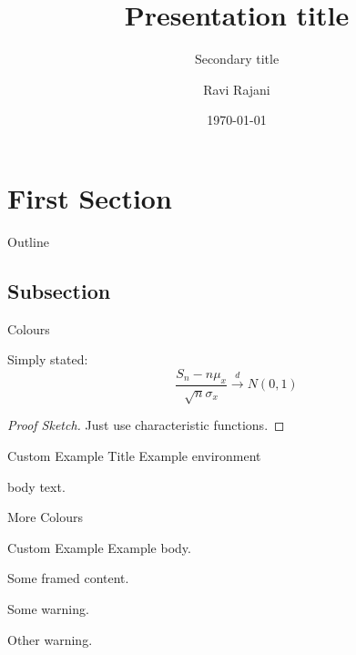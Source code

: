 \documentclass{slides} %
\title{Presentation title}
\subtitle{Secondary title}
\author{Ravi Rajani}
\institute{Department of Mathematics}
\date{\today}
\begin{document}
\begin{frame}
  \titlepage
\end{frame}

\section{First Section}

\begin{frame}{Outline}
  \tableofcontents[currentsection]
\end{frame}

\subsection{Subsection}

\begin{frame}{Colours}
  \begin{theorem}
    Simply stated:
    \[
      \frac{S_n - n\mu_x}{\sqrt{n}\sigma_x}\stackrel{d}{\to} N(0,1)
    \]
  \end{theorem}
  \begin{proof}[Proof Sketch]
    Just use characteristic functions.
  \end{proof}
  \begin{exampleblock}{Custom Example Title}
    Example environment
  \end{exampleblock}
  \begin{infoblock}
    \item body text.
  \end{infoblock}
\end{frame}

\begin{frame}{More Colours}
  \begin{minipage}{.5\textwidth}
    \begin{exampleblock}{Custom Example}
      Example body.
    \end{exampleblock}
  \end{minipage}
  \begin{framedblock}[title=Framed Content]
    Some framed content.\strut
  \end{framedblock}
  \begin{alertblock}[title=Warning]
  \item Some warning.
  \item Other warning.
  \end{alertblock}
\end{frame}
\end{document}
